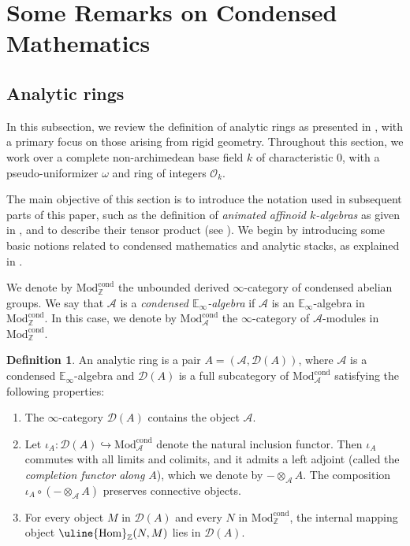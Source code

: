 \documentclass[oneside, hidelinks, 12pt, a4paper,reqno]{amsart}
\theoremstyle{plain}
\theoremstyle{definition}
\newtheorem{definition}[definition]{Definition}
\theoremstyle{plain}
\newcommand{\Z}{\mathbb Z}
\newcommand{\cA}{\mathscr A}
\newcommand{\cD}{\mathscr D}
\newcommand{\cO}{\mathscr O}
\newcommand{\bbE}{\mathbb E}
\newcommand{\cat}{$\infty$-category }
\newcommand{\Hom}{\mathrm{Hom}}
\newcommand{\Mod}{\mathrm{Mod}}
\begin{document}
\section{Some Remarks on Condensed Mathematics}\label{Section 2}
\subsection{Analytic rings}
In this subsection, we review the definition of analytic rings as presented in \cite{Clausen_Scholze_lectures}, with a primary focus on those arising from rigid geometry. Throughout this section, we work over a complete non-archimedean base field $k$ of characteristic $0$, with a pseudo-uniformizer $\omega$ and ring of integers $\cO_{k}$.

The main objective of this section is to introduce the notation used in subsequent parts of this paper, such as the definition of \emph{animated affinoid $k$-algebras} as given in \cite{mikami2023fppfdescentcondensedanimatedrings}, and to describe their tensor product (see ). We begin by introducing some basic notions related to condensed mathematics and analytic stacks, as explained in \cite{Clausen_Scholze_lectures}.

We denote by $\Mod_{\mathbb{Z}}^{\mathrm{cond}}$ the unbounded derived \cat of condensed abelian groups. We say that $\mathscr{A}$ is a \emph{condensed $\bbE_\infty$-algebra} if $\mathscr{A}$ is an $\bbE_\infty$-algebra in $\Mod^{\mathrm{cond}}_\Z$. In this case, we denote by $\Mod^{\mathrm{cond}}_\mathscr{A}$ the \cat of $\mathscr{A}$-modules in $\Mod^{\mathrm{cond}}_\Z$.

\begin{definition}
\label{def:analytic_ring}
    An analytic ring is a pair $A=(\cA, \cD(A))$, where $\cA$ is a condensed $\bbE_{\infty}$-algebra and $\cD(A)$ is a full subcategory of $\Mod^{\mathrm{cond}}_{\cA}$ satisfying the following properties:
    \begin{enumerate}
        \item The \cat $\cD(A)$ contains the object $\cA$.
        \item \label{def:completion} Let $\iota_{A}\colon \cD(A) \hookrightarrow \Mod_{\cA}^{\mathrm{cond}}$ denote the natural inclusion functor. Then $\iota_A$ commutes with all limits and colimits, and it admits a left adjoint (called the \emph{completion functor along $A$}), which we denote by $-\otimes_{\cA}A$. The composition $\iota_A \circ (-\otimes_{\cA}A)$ preserves connective objects.
        \item For every object $M$ in $\cD(A)$ and every $N$ in $\Mod^{\mathrm{cond}}_{\Z}$, the internal mapping object $\uline{\Hom}_{\Z}(N,M)$ lies in $\cD(A)$. 
    \end{enumerate}
\end{definition}
\end{document}
